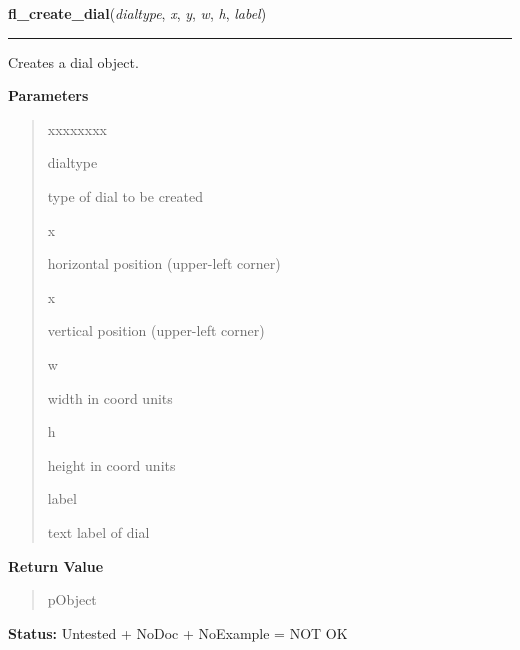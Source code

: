     \label{xformslib:library:fl_create_dial}

    \vspace{0.5ex}

\hspace{.8\funcindent}\begin{boxedminipage}{\funcwidth}

    \raggedright \textbf{fl\_create\_dial}(\textit{dialtype}, \textit{x}, \textit{y}, \textit{w}, \textit{h}, \textit{label})

    \vspace{-1.5ex}

    \rule{\textwidth}{0.5\fboxrule}
\setlength{\parskip}{2ex}
    Creates a dial object.

\setlength{\parskip}{1ex}
      \textbf{Parameters}
      \vspace{-1ex}

      \begin{quote}
        \begin{Ventry}{xxxxxxxx}

          \item[dialtype]

          type of dial to be created

          \item[x]

          horizontal position (upper-left corner)

          \item[x]

          vertical position (upper-left corner)

          \item[w]

          width in coord units

          \item[h]

          height in coord units

          \item[label]

          text label of dial

        \end{Ventry}

      \end{quote}

      \textbf{Return Value}
    \vspace{-1ex}

      \begin{quote}
      pObject

      \end{quote}

\textbf{Status:} Untested + NoDoc + NoExample = NOT OK



    \end{boxedminipage}

